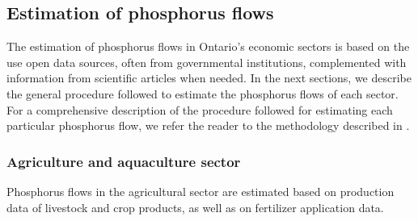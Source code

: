 \documentclass[authoryear]{elsarticle}
\begin{document}

\subsection{Estimation of phosphorus flows}
The estimation of phosphorus flows in Ontario's economic sectors is based on
the use open data sources, often from governmental institutions, complemented with information from scientific articles when needed. In the next sections, we describe the general procedure followed to estimate the phosphorus flows of each sector. For a comprehensive description of the procedure followed for estimating each particular phosphorus flow, we refer the reader to the methodology described in \citet{PFlows_Ontario}.

\subsubsection{Agriculture and aquaculture sector} \label{section:AgriSector}
Phosphorus flows in the agricultural sector are estimated based on production data of livestock and crop products, as well as on fertilizer application data.
\end{document}
